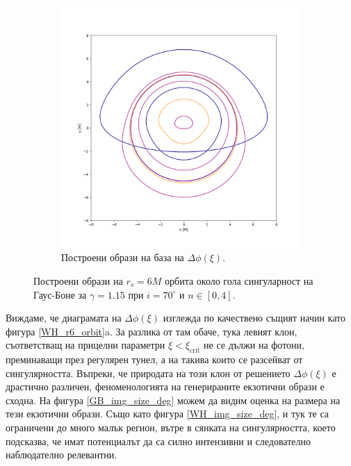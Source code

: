 \begin{figure}[!htb]
\begin{subfigure}{6cm}
	\end{subfigure}\,\,\,
	\begin{subfigure}{6cm}
		\hspace{-0.5cm}
		\includegraphics[scale = 0.3]{GB_70_deg_r6_gamma_1.15.png}
		\caption{Построени образи на база на  $\Delta\phi(\xi)$.} 
	\end{subfigure}
	\caption[Построени образи на $r_s = 6M$ орбита около гола сингулярност на Гаус-Боне за $i = 70^\circ$.]{\small Построени образи на $r_s = 6M$ орбита около гола сингуларност на Гаус-Боне за $\gamma = 1.15$ при $i = 70^\circ$ и $n\in[0,4]$.} 
	\label{GB_r6_70_deg_gamma_1.15}
\end{figure}

Виждаме, че диаграмата на $\Delta\phi(\xi)$ изглежда по качествено същият начин като фигура \ref{WH_r6_orbit}a. За разлика от там обаче, тука левият клон, съответстващ на прицелни параметри $\xi < \xi_\text{crit}$ не се дължи на фотони, преминаващи през регулярен тунел, а на такива които се разсейват от сингулярността. Въпреки, че природата на този клон от решението $\Delta\phi(\xi)$ е драстично различен, феноменологията на генерираните екзотични образи е сходна. На фигура \ref{GB_img_size_deg} можем да видим оценка на размера на тези екзотични образи. Също като фигура \ref{WH_img_size_deg}, и тук те са ограничени до много малък регион, вътре в сянката на сингулярността, което подсказва, че имат потенциалът да са силно интензивни и следователно наблюдателно релевантни.

